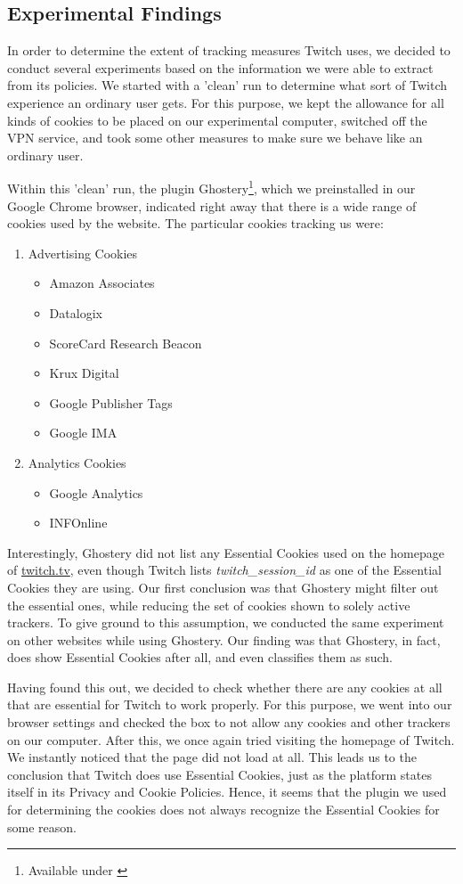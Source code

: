 \subsection{Experimental Findings}
In order to determine the extent of tracking measures Twitch uses, we decided to conduct several experiments based on the information we were able to extract from its policies. 
We started with a 'clean' run to determine what sort of Twitch experience an ordinary user gets. For this purpose, we kept the allowance for all kinds of cookies to be placed on our experimental computer, switched off the VPN service, and took some other measures to make sure we behave like an ordinary user. 

Within this 'clean' run, the plugin Ghostery\footnote{Available under \cite{ghostery-plugin}}, which we preinstalled in our Google Chrome browser, indicated right away that there is a wide range of cookies used by the website. The particular cookies tracking us were: 
\begin{enumerate}
	\item Advertising Cookies
	\begin{itemize}
		\item Amazon Associates
		\item Datalogix
		\item ScoreCard Research Beacon
		\item Krux Digital
		\item Google Publisher Tags
		\item Google IMA
	\end{itemize}
	\item Analytics Cookies
	\begin{itemize}
		\item Google Analytics
		\item INFOnline
	\end{itemize}
\end{enumerate}
Interestingly, Ghostery did not list any Essential Cookies used on the homepage of \url{twitch.tv}, even though Twitch lists \textit{twitch\_session\_id} as one of the Essential Cookies they are using. 
Our first conclusion was that Ghostery might filter out the essential ones, while reducing the set of cookies shown to solely active trackers. To give ground to this assumption, we conducted the same experiment on other websites while using Ghostery. Our finding was that Ghostery, in fact, does show Essential Cookies after all, and even classifies them as such. 

Having found this out, we decided to check whether there are any cookies at all that are essential for Twitch to work properly. For this purpose, we went into our browser settings and checked the box to not allow any cookies and other trackers on our computer. After this, we once again tried visiting the homepage of Twitch. We instantly noticed that the page did not load at all. This leads us to the conclusion that Twitch does use Essential Cookies, just as the platform states itself in its Privacy and Cookie Policies. Hence, it seems that the plugin we used for determining the cookies does not always recognize the Essential Cookies for some reason. 

